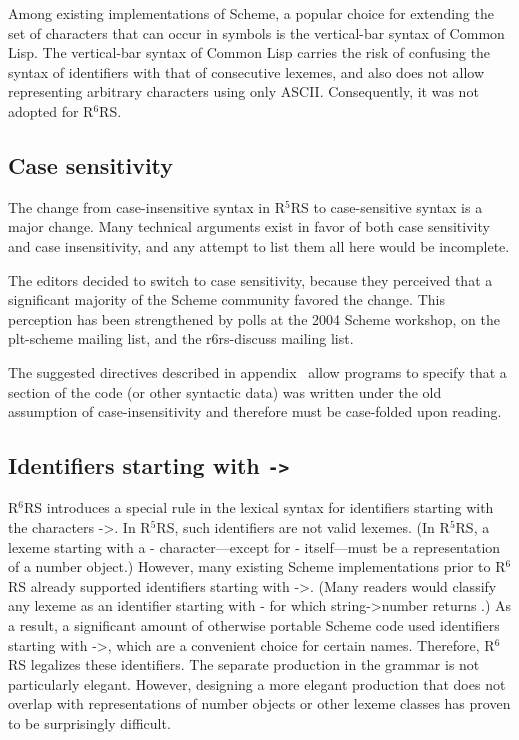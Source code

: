 \documentclass[twoside,twocolumn]{algol60}
\newcommand{\rn}[1]{R$^{#1}$RS}
\begin{document}
Among existing implementations of Scheme, a popular choice for
extending the set of characters that can occur in symbols is the
vertical-bar syntax of Common Lisp.  The vertical-bar syntax of Common
Lisp carries the risk of confusing the syntax of identifiers with that
of consecutive lexemes, and also does not allow representing arbitrary
characters using only ASCII.  Consequently, it was not adopted for
\rn{6}.

\subsection{Case sensitivity}
\label{casesensitivityrationalesection}

The change from case-insensitive syntax in \rn{5} to case-sensitive
syntax is a major change.  Many technical arguments exist in favor of
both case sensitivity and case insensitivity, and any attempt to list
them all here would be incomplete.  

The editors decided to switch to case sensitivity, because they
perceived that a significant majority of the Scheme community favored
the change.  This perception has been strengthened by polls at the
2004 Scheme workshop, on the {\cf plt-scheme} mailing list, and the
{\cf r6rs-discuss} mailing list.

The suggested directives described in
appendix~ allow programs to specify that a section of the code (or other
syntactic data) was written under the old assumption of
case-insensitivity and therefore must be case-folded upon reading.

\subsection{Identifiers starting with {\tt ->}}

\rn{6} introduces a special rule in the lexical syntax for
identifiers starting with the characters {\cf ->}.  In \rn{5}, such
identifiers are not valid lexemes.  (In \rn{5}, a lexeme starting
with a {\cf -} character---except for {\cf -} itself---must be a
representation of a number object.)
However, many existing
Scheme implementations prior to \rn{6} already supported identifiers
starting with {\cf ->}.  (Many readers would classify any lexeme as an
identifier starting with {\cf -} for which {\cf string->number}
returns \schfalse{}.)  As a result, a significant amount of otherwise
portable Scheme code used identifiers starting with {\cf ->}, which
are a convenient choice for certain names.  Therefore, \rn{6} legalizes
these identifiers.  The separate production in the grammar is not particularly elegant.
However, designing a more elegant production that does not overlap with
representations of number objects or other lexeme classes has proven to be surprisingly
difficult.
\end{document}
